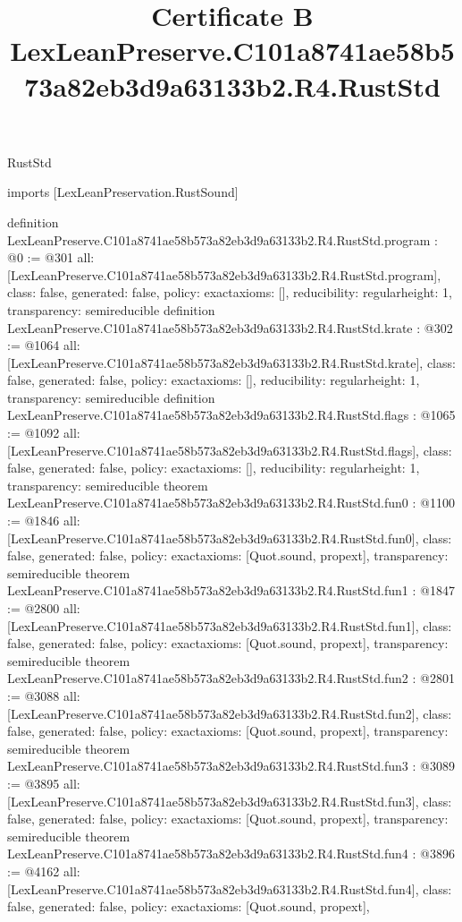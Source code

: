 \begin{lexlean}{RustStd}
\title{Certificate B LexLeanPreserve.C101a8741ae58b573a82eb3d9a63133b2.R4.RustStd}
\begin{coremodule}
imports [LexLeanPreservation.RustSound]

definition LexLeanPreserve.C101a8741ae58b573a82eb3d9a63133b2.R4.RustStd.program : @0 := @301 {
  all: [LexLeanPreserve.C101a8741ae58b573a82eb3d9a63133b2.R4.RustStd.program],
  class: false,
  generated: false,
  policy: exact{axioms: []},
  reducibility: regular{height: 1},
  transparency: semireducible
}
definition LexLeanPreserve.C101a8741ae58b573a82eb3d9a63133b2.R4.RustStd.krate : @302 := @1064 {
  all: [LexLeanPreserve.C101a8741ae58b573a82eb3d9a63133b2.R4.RustStd.krate],
  class: false,
  generated: false,
  policy: exact{axioms: []},
  reducibility: regular{height: 1},
  transparency: semireducible
}
definition LexLeanPreserve.C101a8741ae58b573a82eb3d9a63133b2.R4.RustStd.flags : @1065 := @1092 {
  all: [LexLeanPreserve.C101a8741ae58b573a82eb3d9a63133b2.R4.RustStd.flags],
  class: false,
  generated: false,
  policy: exact{axioms: []},
  reducibility: regular{height: 1},
  transparency: semireducible
}
theorem LexLeanPreserve.C101a8741ae58b573a82eb3d9a63133b2.R4.RustStd.fun0 : @1100 := @1846 {
  all: [LexLeanPreserve.C101a8741ae58b573a82eb3d9a63133b2.R4.RustStd.fun0],
  class: false,
  generated: false,
  policy: exact{axioms: [Quot.sound, propext]},
  transparency: semireducible
}
theorem LexLeanPreserve.C101a8741ae58b573a82eb3d9a63133b2.R4.RustStd.fun1 : @1847 := @2800 {
  all: [LexLeanPreserve.C101a8741ae58b573a82eb3d9a63133b2.R4.RustStd.fun1],
  class: false,
  generated: false,
  policy: exact{axioms: [Quot.sound, propext]},
  transparency: semireducible
}
theorem LexLeanPreserve.C101a8741ae58b573a82eb3d9a63133b2.R4.RustStd.fun2 : @2801 := @3088 {
  all: [LexLeanPreserve.C101a8741ae58b573a82eb3d9a63133b2.R4.RustStd.fun2],
  class: false,
  generated: false,
  policy: exact{axioms: [Quot.sound, propext]},
  transparency: semireducible
}
theorem LexLeanPreserve.C101a8741ae58b573a82eb3d9a63133b2.R4.RustStd.fun3 : @3089 := @3895 {
  all: [LexLeanPreserve.C101a8741ae58b573a82eb3d9a63133b2.R4.RustStd.fun3],
  class: false,
  generated: false,
  policy: exact{axioms: [Quot.sound, propext]},
  transparency: semireducible
}
theorem LexLeanPreserve.C101a8741ae58b573a82eb3d9a63133b2.R4.RustStd.fun4 : @3896 := @4162 {
  all: [LexLeanPreserve.C101a8741ae58b573a82eb3d9a63133b2.R4.RustStd.fun4],
  class: false,
  generated: false,
  policy: exact{axioms: [Quot.sound, propext]},
}
\end{coremodule}
\end{lexlean}
